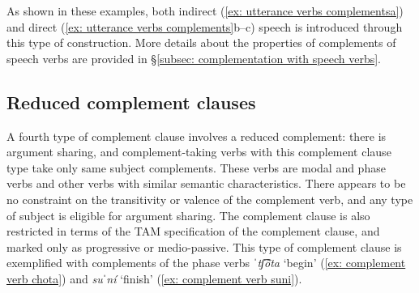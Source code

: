 As shown in these examples, both indirect (\ref{ex: utterance verbs complementsa}) and direct (\ref{ex: utterance verbs complements}b--c) speech is introduced through this type of construction. More details about the properties of complements of speech verbs are provided in §\ref{subsec: complementation with speech verbs}.



\subsection{Reduced complement clauses}
\label{subsec: reduced complement clauses}

A fourth type of complement clause involves a reduced complement: there is argument sharing, and complement-taking verbs with this complement clause type take only same subject complements. These verbs are modal and phase verbs and other verbs with similar semantic characteristics. There appears to be no constraint on the transitivity or valence of the complement verb, and any type of subject is eligible for argument sharing. The complement clause is also restricted in terms of the TAM specification of the complement clause, and marked only as progressive or medio-passive. This type of complement clause is exemplified with complements of the phase verbs \textit{ˈtʃ͡ôta} `begin' (\ref{ex: complement verb chota}) and \textit{suˈní} `finish' (\ref{ex: complement verb suni}).

\ea\label{ex: complement verb chota}

    \label{ex: complement verb chotaa}
        \label{ex: complement verb chotab}
    \z
\z

